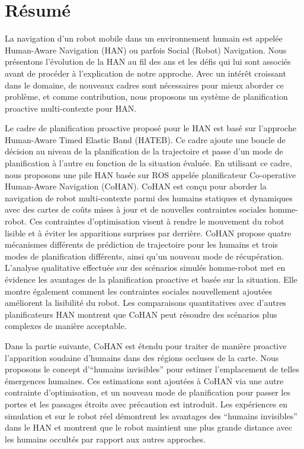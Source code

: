 \chapter*{R\'esum\'e}

La navigation d'un robot mobile dans un environnement humain est appelée Human-Aware Navigation (HAN) ou parfois Social (Robot) Navigation. Nous présentons l'évolution de la HAN au fil des ans et les défis qui lui sont associés avant de procéder à l'explication de notre approche. Avec un intérêt croissant dans le domaine, de nouveaux cadres sont nécessaires pour mieux aborder ce problème, et comme contribution, nous proposons un système de planification proactive multi-contexte pour HAN. 

Le cadre de planification proactive proposé pour le HAN est basé sur l'approche Human-Aware Timed Elastic Band (HATEB). Ce cadre ajoute une boucle de décision au niveau de la planification de la trajectoire et passe d'un mode de planification à l'autre en fonction de la situation évaluée. En utilisant ce cadre, nous proposons une pile HAN basée sur ROS appelée planificateur Co-operative Human-Aware Navigation (CoHAN). CoHAN est conçu pour aborder la navigation de robot multi-contexte parmi des humains statiques et dynamiques avec des cartes de coûts mises à jour et de nouvelles contraintes sociales homme-robot. Ces contraintes d'optimisation visent à rendre le mouvement du robot lisible et à éviter les apparitions surprises par derrière. CoHAN propose quatre mécanismes différents de prédiction de trajectoire pour les humains et trois modes de planification différents, ainsi qu'un nouveau mode de récupération. L'analyse qualitative effectuée sur des scénarios simulés homme-robot met en évidence les avantages de la planification proactive et basée sur la situation. Elle montre également comment les contraintes sociales nouvellement ajoutées améliorent la lisibilité du robot. Les comparaisons quantitatives avec d'autres planificateurs HAN montrent que CoHAN peut résoudre des scénarios plus complexes de manière acceptable.

Dans la partie suivante, CoHAN est étendu pour traiter de manière proactive l'apparition soudaine d'humains dans des régions occluses de la carte. Nous proposons le concept d'“humains invisibles” pour estimer l'emplacement de telles émergences humaines. Ces estimations sont ajoutées à CoHAN via une autre contrainte d'optimisation, et un nouveau mode de planification pour passer les portes et les passages étroits avec précaution est introduit. Les expériences en simulation et sur le robot réel démontrent les avantages des “humains invisibles” dans le HAN et montrent que le robot maintient une plus grande distance avec les humains occultés par rapport aux autres approches.

